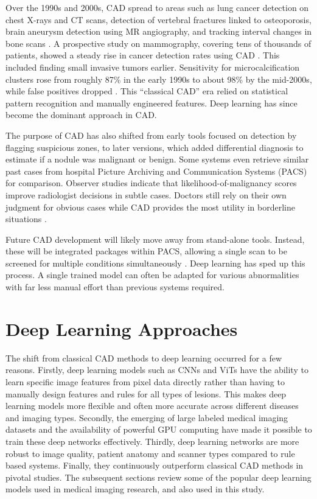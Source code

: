 Over the 1990s and 2000s, CAD spread to areas such as lung cancer detection on chest X-rays and CT scans,
detection of vertebral fractures linked to osteoporosis, brain aneurysm detection using MR angiography,
and tracking interval changes in bone scans \cite{CAD2007}. A prospective study on mammography,
covering tens of thousands of patients, showed a steady rise in cancer detection rates using CAD \cite{doi:10.1148/radiol.2203001282}.
This included finding small invasive tumors earlier. Sensitivity for microcalcification clusters
rose from roughly 87\% in the early 1990s to about 98\% by the mid-2000s, while false positives dropped \cite{article2004}.
This ``classical CAD'' era relied on statistical pattern recognition and manually engineered features.
Deep learning has since become the dominant approach in CAD.

The purpose of CAD has also shifted from early tools focused on detection by flagging suspicious zones, to
later versions, which added differential diagnosis to estimate if a nodule was malignant or benign.
Some systems even retrieve similar past cases from hospital Picture Archiving and Communication Systems (PACS) for comparison.
Observer studies indicate that likelihood-of-malignancy scores improve radiologist decisions in subtle cases.
Doctors still rely on their own judgment for obvious cases while CAD provides the most utility in borderline situations \cite{doi:10.1148/radiol.2272020498}.

Future CAD development will likely move away from stand-alone tools. Instead, these will be integrated packages within PACS,
allowing a single scan to be screened for multiple conditions simultaneously \cite{DOI2007198}. Deep learning has sped up this process.
A single trained model can often be adapted for various abnormalities with far less manual effort than previous systems required.

\section{Deep Learning Approaches}

The shift from classical CAD methods to deep learning occurred for a few reasons. Firstly, deep learning models
such as CNNs and ViTs have the ability to learn specific image features from pixel data directly
rather than having to manually design features and rules for all types of lesions. This makes deep learning models more flexible
and often more accurate across different diseases and imaging types. Secondly, the emerging of large labeled medical imaging datasets
and the availability of powerful GPU computing have made it possible to train these deep networks effectively.
Thirdly, deep learning networks are more robust to image quality, patient anatomy and scanner types compared to rule based systems.
Finally, they continuously outperform classical CAD methods in pivotal studies.
The subsequent sections review some of the popular deep learning models used in medical imaging research, and also used in this study.

